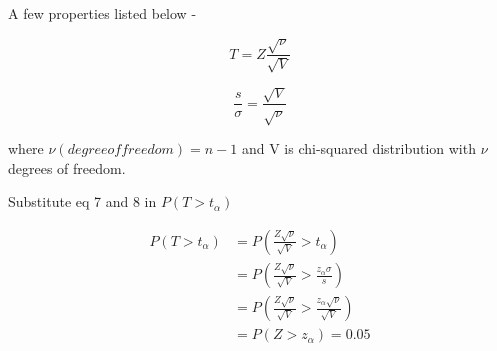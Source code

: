 \documentclass{article}
\begin{document}
\vspace{0.3cm}

A few properties listed below - 

\begin{equation}
    T = Z \frac{\sqrt{\nu}}{\sqrt{V}}
\end{equation}

\begin{equation}
    \frac{s}{\sigma} = \frac{\sqrt{V}}{\sqrt{\nu}}
\end{equation}

where $\nu (degree of freedom)= n-1 $ and V is chi-squared distribution with $\nu$ degrees of freedom.

\vspace{0.3cm}

Substitute eq 7 and 8 in $P(T> t_{\alpha})$

\begin{equation} 
\begin{split}
P(T> t_{\alpha}) & = P(\frac{Z \sqrt{\nu}}{\sqrt{V}} > t_{\alpha}) \\
 & = P(\frac{Z \sqrt{\nu}}{\sqrt{V}} > \frac{z_{\alpha} \sigma}{s}) \\
 & =  P(\frac{Z \sqrt{\nu}}{\sqrt{V}} > \frac{z_{\alpha} \sqrt{\nu}}{\sqrt{V}})\\
 & = P(Z > z_{\alpha}) = 0.05
\end{split}
\end{equation}
    
\end{document}

